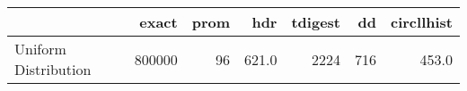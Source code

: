 \begin{tabular}{lrrrrrr}
\toprule
{} &   exact &  prom &    hdr &  tdigest &   dd &  circllhist \\
\midrule
Uniform Distribution &  800000 &    96 &  621.0 &     2224 &  716 &       453.0 \\
\bottomrule
\end{tabular}
